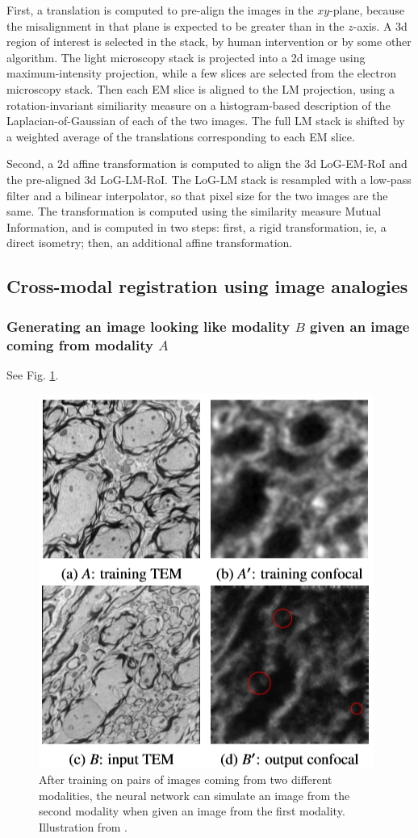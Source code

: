 \documentclass[11pt]{article} %
\begin{document}
First, a translation is computed to pre-align the images in the $xy$-plane, because the misalignment in that plane is expected to be greater than in the $z$-axis. A 3d region of interest is selected in the stack, by human intervention or by some other algorithm. The light microscopy stack is projected into a 2d image using maximum-intensity projection, while a few slices are selected from the electron microscopy stack. Then each EM slice is aligned to the LM projection, using a rotation-invariant similiarity measure on a histogram-based description of the Laplacian-of-Gaussian of each of the two images. The full LM stack is shifted by a weighted average of the translations corresponding to each EM slice.

Second, a 2d affine transformation is computed to align the 3d LoG-EM-RoI and the pre-aligned 3d LoG-LM-RoI. The LoG-LM stack is resampled with a low-pass filter and a bilinear interpolator, so that pixel size for the two images are the same. The transformation is computed using the similarity measure Mutual Information, and is computed in two steps: first, a rigid transformation, ie, a direct isometry; then, an additional affine transformation.

  \subsection{Cross-modal registration using image analogies}
    \subsubsection{Generating an image looking like modality $B$ given an image coming from modality $A$ \cite{hertzmann:analogies}}See Fig. \ref{fig:analogies}.
\begin{figure}[h!]
  \centering
  \includegraphics[width=0.60 \linewidth]{analogies.png}
  \caption{After training on pairs of images coming from two different modalities, the neural network can simulate an image from the second modality when given an image from the first modality. Illustration from \cite{cao:analogies}.}
  \label{fig:analogies}
\end{figure}
\end{document}
